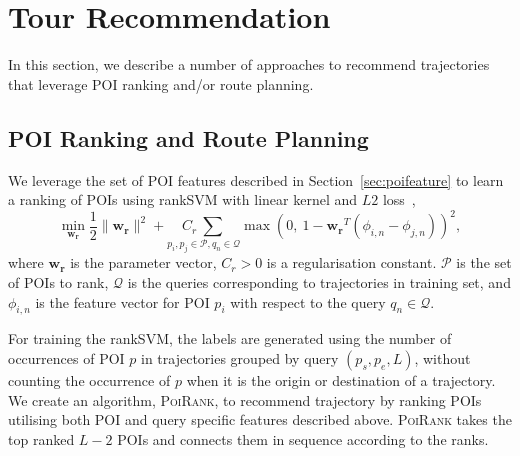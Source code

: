 \section{Tour Recommendation}
\label{sec:recommendation}

In this section, we describe a number of approaches to recommend trajectories that leverage POI ranking and/or route planning.

\subsection{POI Ranking and Route Planning}
\label{sec:rankplan}

We leverage the set of POI features described in Section~\ref{sec:poifeature}
to learn a ranking of POIs using rankSVM with linear kernel and $L2$ loss~\cite{lranksvm},
\begin{equation*}
\min_{\mathbf{w_r}} \frac{1}{2} 
                     \|\mathbf{w_r}\|^2 + 
                    \underset{p_i, p_j \in \mathcal{P}, q_n \in \mathcal{Q}}{C_r ~\sum}
                    \max \left( 0,~ 1 - \mathbf{w_r}^T (\phi_{i,n} - \phi_{j,n}) \right)^2,
\end{equation*}
where $\mathbf{w_r}$ is the parameter vector,
$C_r > 0$ is a regularisation constant.
$\mathcal{P}$ is the set of POIs to rank,
$\mathcal{Q}$ is the queries corresponding to trajectories in training set,
and $\phi_{i,n}$ is the feature vector for POI $p_i$ with respect to the query $q_n \in \mathcal{Q}$.

For training the rankSVM, the labels are generated using the number of occurrences of
POI $p$ in trajectories grouped by query $(p_s, p_e, L)$,
without counting the occurrence of $p$ when it is the origin or destination of a trajectory.
We create an algorithm, \textsc{PoiRank}, to recommend trajectory by ranking POIs 
utilising both POI and query specific features described above. 
\textsc{PoiRank} takes the top ranked $L-2$ POIs and connects them in sequence according to the ranks.




